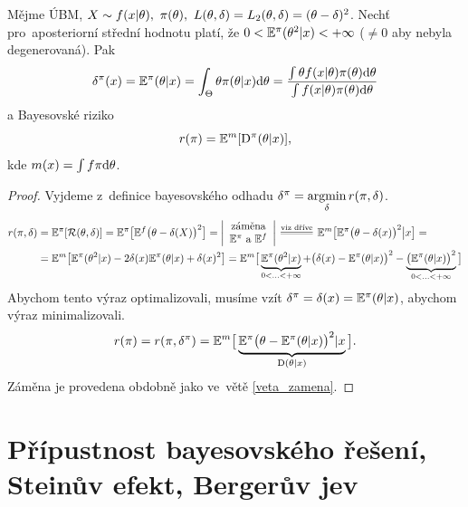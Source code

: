 \begin{theorem}[!!!Vyhazovací!!!]\label{vyhazovaci}
	Mějme ÚBM, $X\sim f(x|\theta),~\pi(\theta),~L(\theta,\delta)=L_2(\theta,\delta)=(\theta-\delta)^2$. Nechť pro~aposteriorní střední hodnotu platí, že $0<\mathbb{E}^\pi(\theta^2|x)<+\infty$ ($\neq 0$ aby nebyla degenerovaná). Pak $$\delta^\pi(x)=\mathbb{E}^\pi(\theta|x)=\int_\Theta \theta\pi(\theta| x)\mathrm{d}\theta=\frac{\int\theta f(x|\theta)\pi(\theta)\mathrm{d}\theta}{\int f(x|\theta)\pi(\theta)\mathrm{d}\theta}$$
	a Bayesovské riziko 
	$$r(\pi)=\mathbb{E}^m[\mathrm{D}^\pi(\theta|x)],$$
	kde $m(x)=\int f\pi\mathrm{d}\theta$.
	\begin{proof}
		Vyjdeme z~definice bayesovského odhadu $\delta^\pi=\mathop{\mathrm{argmin}}\limits_{\delta} r(\pi,\delta)$.
		\[
		\begin{split}
		r(\pi,\delta)&=\E^\pi[\RF(\t,\delta)]=\E^\pi\big[\E^f\big(\t-\delta(X)\big)^2\big]=\left|\begin{array}{c}
		\text{záměna} \\ \E^\pi\text{ a~}\E^f		
		\end{array}
		\right|\equal{\text{viz dříve}}\E^m\big[\E^\pi\big(\t-\delta(x)\big)^2\big|x\big]=\\&=\E^m\big[\E^\pi(\t^2|x)-2\delta(x)\E^\pi(\t|x)+\delta(x)^2\big]=\E^m\big[\underbrace{\E^\pi(\t^2|x)}_{0<...<+\infty}+\big(\delta(x)-\E^\pi(\t|x)\big)^2-\underbrace{\big(\E^\pi(\t|x)\big)^2}_{0<...<+\infty}\big]
		\end{split}
		\] Abychom tento výraz optimalizovali, musíme vzít $\delta^{\pi}=\delta(x)=\mathbb{E}^\pi(\theta|x)$, abychom výraz minimalizovali.
		$$ r(\pi)=r(\pi,\delta^\pi)=\mathbb{E}^m\big[\underbrace{\mathbb{E}^\pi\big(\theta-\mathbb{E}^\pi(\theta|x)\big)^2|x}_{\mathrm{D}(\theta|x)}\big].$$
		Záměna je provedena obdobně jako ve~větě \ref{veta_zamena}.
	\end{proof}
\end{theorem}

\chapter{Přípustnost bayesovského řešení, Steinův efekt, Bergerův jev}

